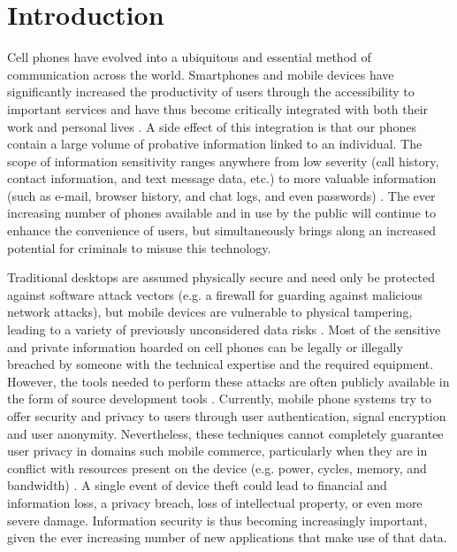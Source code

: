 \documentclass[conference,10pt]{IEEEtran}
\begin{document}




%
\IEEEpeerreviewmaketitle

\section{Introduction}
Cell phones have evolved into a ubiquitous and essential method of communication across the world.  
Smartphones and mobile devices have significantly increased the productivity of users through the 
accessibility to important services and have thus become critically integrated with both their work and 
personal lives \cite{mobile}.   A side effect of this integration is that our phones contain a large volume 
of probative information linked to an individual.  The scope of information sensitivity ranges anywhere 
from low severity (call history, contact information, and text message data, etc.) to more valuable 
information (such as e-mail, browser history, and chat logs, and even passwords) \cite{lost_phone}.  The 
ever increasing number of phones available and in use by the public will continue to enhance the 
convenience of users, but simultaneously brings along an increased potential for criminals to misuse this 
technology.

Traditional desktops are assumed physically secure and need only be protected against software attack 
vectors (e.g. a firewall for guarding against malicious network attacks), but mobile devices are vulnerable 
to physical tampering, leading to a variety of previously unconsidered data risks \cite{mobile}.  Most of 
the sensitive and private information hoarded on cell phones can be legally or illegally breached by 
someone with the technical expertise and the required equipment.  However, the tools needed to perform 
these attacks are often publicly available in the form of source development tools \cite{forensics}.  
Currently, mobile phone systems try to offer security and privacy to users through user authentication, 
signal encryption and user anonymity. Nevertheless, these techniques cannot completely guarantee user 
privacy in domains such mobile commerce, particularly when they are in conflict with resources present on 
the device (e.g. power, cycles, memory, and bandwidth) \cite{mobile}.  A single event of device theft could 
lead to financial and information loss, a privacy breach, loss of intellectual property, or even more 
severe damage.  Information security is thus becoming increasingly important, given the ever increasing 
number of new applications that make use of that data.
\end{document}
